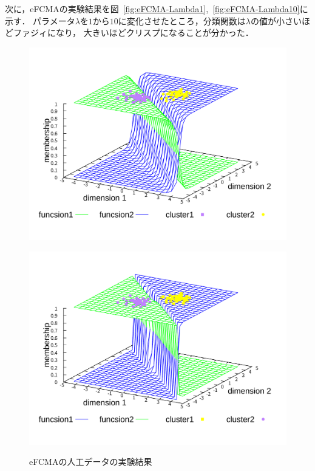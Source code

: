 \documentclass[a4j,12pt,dvipdfmx,oneside]{jsbook}
\theoremstyle{definition}
\begin{document}
  次に，eFCMAの実験結果を図~\ref{fig:eFCMA-Lambda1},~\ref{fig:eFCMA-Lambda10}に示す．
  パラメータ$\lambda$を$1$から$10$に変化させたところ，分類関数は$\lambda$の値が小さいほどファジィになり，
  大きいほどクリスプになることが分かった．

  \begin{figure}[p]
   \centering
   \begin{minipage}{0.43\hsize}
    \includegraphics[width=\linewidth]{eFCMA-Lambda1.pdf}
    \label{fig:eFCMA-Lambda1}
   \end{minipage}
   \begin{minipage}{0.43\hsize}
    \includegraphics[width=\linewidth]{eFCMA-Lambda10.pdf}
    \label{fig:eFCMA-Lambda10}
   \end{minipage}
   \vspace*{0.5cm}
   \caption{eFCMAの人工データの実験結果}
   \label{fig:eFCMA}
  \end{figure}
  
\end{document}
